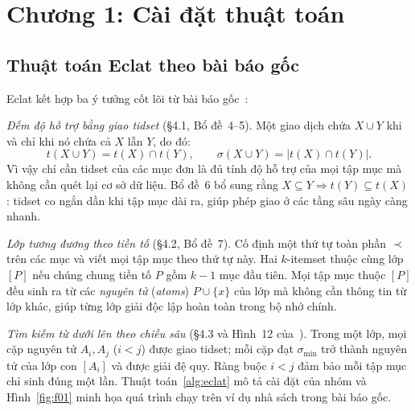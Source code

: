 \section{Chương 1: Cài đặt thuật toán}
\label{sec:03_chapter1_implementation}

\subsection{Thuật toán Eclat theo bài báo gốc}
\label{subsec:eclat_algo}

Eclat kết hợp ba ý tưởng cốt lõi từ bài báo gốc~\cite{zaki2000scalable}:

\emph{Đếm độ hỗ trợ bằng giao tidset} (§4.1, Bổ đề~4--5). Một giao dịch chứa $X \cup Y$ khi và chỉ khi nó chứa cả $X$ lẫn $Y$, do đó:
\begin{equation}
t(X \cup Y) = t(X) \cap t(Y), \qquad \sigma(X \cup Y) = |t(X) \cap t(Y)|.
\label{eq:intersection}
\end{equation}
Vì vậy chỉ cần tidset của các mục đơn là đủ tính độ hỗ trợ của mọi tập mục mà không cần quét lại cơ sở dữ liệu. Bổ đề~6 bổ sung rằng $X \subseteq Y \Rightarrow t(Y) \subseteq t(X)$: tidset co ngắn dần khi tập mục dài ra, giúp phép giao ở các tầng sâu ngày càng nhanh.

\emph{Lớp tương đương theo tiền tố} (§4.2, Bổ đề~7). Cố định một thứ tự toàn phần $\prec$ trên các mục và viết mọi tập mục theo thứ tự này. Hai $k$-itemset thuộc cùng lớp $[P]$ nếu chúng chung tiền tố $P$ gồm $k-1$ mục đầu tiên. Mọi tập mục thuộc $[P]$ đều sinh ra từ các \emph{nguyên tử} (\emph{atoms}) $P \cup \{x\}$ của lớp mà không cần thông tin từ lớp khác, giúp từng lớp giải độc lập hoàn toàn trong bộ nhớ chính.

\emph{Tìm kiếm từ dưới lên theo chiều sâu} (§4.3 và Hình~12 của~\cite{zaki2000scalable}). Trong một lớp, mọi cặp nguyên tử $A_i, A_j$ ($i < j$) được giao tidset; mỗi cặp đạt $\sigma_{\min}$ trở thành nguyên tử của lớp con $[A_i]$ và được giải đệ quy. Ràng buộc $i < j$ đảm bảo mỗi tập mục chỉ sinh đúng một lần. Thuật toán~\ref{alg:eclat} mô tả cài đặt của nhóm và Hình~\ref{fig:f01} minh họa quá trình chạy trên ví dụ nhà sách trong bài báo gốc.

